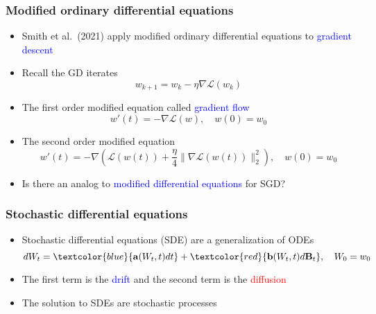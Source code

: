 \documentclass[aspectratio=1610,10pt,ucs]{beamer} %
\newcommand{\norm}[1]{\lVert{#1}\rVert_2}
\begin{document}
\begin{frame}
\frametitle{Modified ordinary differential equations}
\begin{itemize}
  \item Smith et al.\ (2021) apply modified ordinary differential equations to \textcolor{blue}{gradient descent}
  \item Recall the GD iterates
  \begin{equation*}
      w_{k+1} = w_k - \eta \nabla \mathcal{L}(w_k)
  \end{equation*}
  \item The first order modified equation called \textcolor{blue}{gradient flow}
  \begin{equation*}
  w'(t) = -\nabla \mathcal{L}(w), \quad w(0) = w_0
  \end{equation*}
  \item The second order modified equation
  \begin{equation*}
    w'(t) = -\nabla\left(\mathcal{L}(w(t)) + \frac{\eta}{4}\norm{\nabla \mathcal{L}(w(t))}^2\right),\quad w(0) = w_0
  \end{equation*}
\end{itemize}
\end{frame}
\begin{frame}
  \begin{itemize}
    \item Is there an analog to \textcolor{blue}{modified differential equations} for SGD?
    
  \end{itemize}
\end{frame}
\begin{frame}
  \frametitle{Stochastic differential equations}
  \begin{itemize}
    \item Stochastic differential equations (SDE) are a generalization of ODEs
    \begin{equation*}
      dW_t = \textcolor{blue}{\mathbf{a}(W_t,t)dt} + \textcolor{red}{\mathbf{b}(W_t,t)d\mathbf{B}_t}, \quad W_0 = w_0
    \end{equation*}
    \item The first term is the \textcolor{blue}{drift} and the second term is the \textcolor{red}{diffusion}
    \item The solution to SDEs are stochastic processes
  \end{itemize}
\end{frame}
\end{document}
